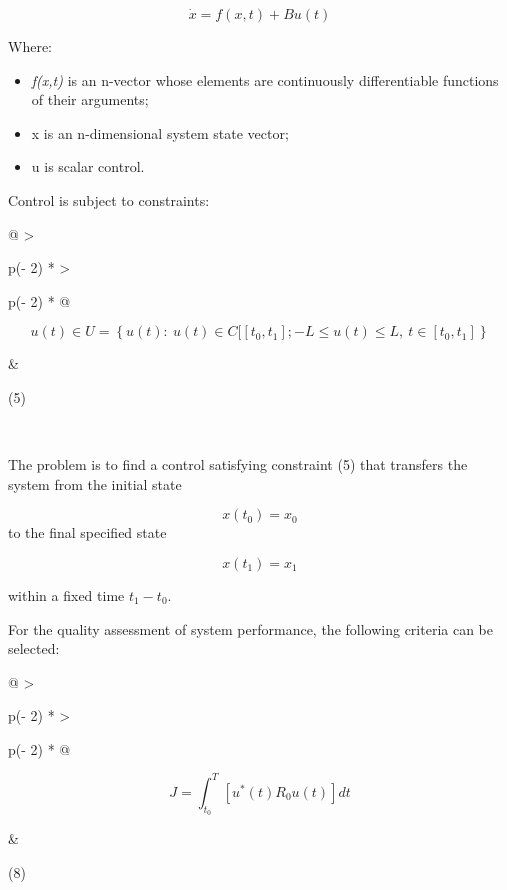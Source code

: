 \begin{equation}
  \dot{{x}} = {f}\left( {x,t} \right) + {Bu(t)}
  \tag{4}
  \end{equation}
  

Where:

\begin{itemize}
\item
  \emph{f(x,t)} is an n-vector whose elements are continuously
  differentiable functions of their arguments;
\item
  x is an n-dimensional system state vector;
\item
  u is scalar control.
\end{itemize}


Control is subject to constraints:


\begin{longtable}[]{@{}
  >{\raggedright\arraybackslash}p{(\columnwidth - 2\tabcolsep) * }
  >{\raggedright\arraybackslash}p{(\columnwidth - 2\tabcolsep) * }@{}}
\begin{minipage}[b]{\linewidth}\raggedright
\[u(t) \in U = \left\{ u(t):\ u(t) \in C\lbrack\left\lbrack t_{0},t_{1} \right\rbrack; - L \leq u(t) \leq L,\ t \in \left\lbrack t_{0},t_{1} \right\rbrack \right\}\]
\end{minipage} & \begin{minipage}[b]{\linewidth}\raggedright
(5)
\end{minipage} \\
\end{longtable}

The problem is to find a control satisfying constraint (5) that
transfers the system from the initial state

\begin{equation}
  x\left( t_{0} \right) = x_{0}
  \tag{6}
  \end{equation}
to the final specified state

\begin{equation}
  x(t_1) = x_1 \tag{7}
  \end{equation}
  

within a fixed time \(t_{1} - t_{0}\).

For the quality assessment of system performance, the following criteria
can be selected:

\begin{longtable}[]{@{}
  >{\raggedright\arraybackslash}p{(\columnwidth - 2\tabcolsep) * }
  >{\raggedright\arraybackslash}p{(\columnwidth - 2\tabcolsep) * }@{}}
\begin{minipage}[b]{\linewidth}\raggedright
\[J = \int_{t_{0}}^{T}{\left\lbrack u^{*}(t)R_{0}u(t) \right\rbrack dt}\]
\end{minipage} & \begin{minipage}[b]{\linewidth}\raggedright
(8)
\end{minipage} \\
\end{longtable}

